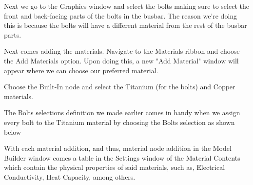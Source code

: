 Next we go to the Graphics window and select the bolts making sure to select the front and back-facing parts of the bolts in the busbar. The reason we're doing this is because the bolts will have a different material from the rest of the busbar parts.


Next comes adding the materials. Navigate to the Materials ribbon and choose the Add Materials option. Upon doing this, a new "Add Material" window will appear where we can choose our preferred material.


Choose the Built-In node and select the Titanium (for the bolts) and Copper materials.


The Bolts selections definition we made earlier comes in handy when we assign every bolt to the Titanium material by choosing the Bolts selection as shown below


With each material addition, and thus, material node addition in the Model Builder window comes a table in the Settings window of the Material Contents which contain the physical properties of said materials, such as, Electrical Conductivity, Heat Capacity, among others.



